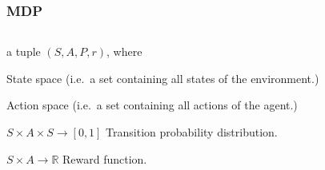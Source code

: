 \documentclass[12pt, aspectratio = 169, xcolor = x11names]{beamer}
\begin{document}
\begin{frame}
  \frametitle{MDP}
  \begin{columns}
    \pause%
    \begin{column}{0.52\textwidth}
      \begin{definition}[MDP]
        a tuple $(S, A, P, r)$, where
      \end{definition}
      \pause%
      \begin{description}[<+->]
        \item[$S$]State space (i.e.\ a set containing all states of the
          environment.)
        \item[$A$]Action space (i.e.\ a set containing all actions of the agent.)
        \item[$P$]$S \times A \times S \rightarrow [0, 1]$ Transition
          probability distribution.
        \item[$r$]$S \times A \rightarrow \mathbb{R}$ Reward function.
      \end{description}
    \end{column}
  \end{columns}
\end{frame}
\end{document}
